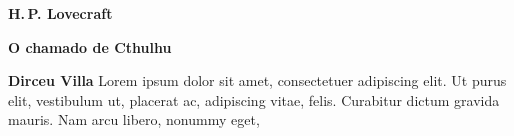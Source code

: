 \textbf{H.\,P. Lovecraft} \lipsum[1] 

\textbf{O chamado de Cthulhu} \lipsum[1] 
 
\textbf{Dirceu Villa} Lorem ipsum dolor sit amet, consectetuer adipiscing
elit. Ut purus elit, vestibulum ut, placerat ac, adipiscing vitae, felis.
Curabitur dictum gravida mauris. Nam arcu libero, nonummy eget,


